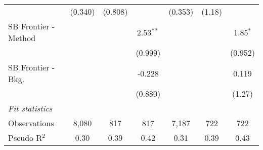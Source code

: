 \begin{tabular}{lcccccc}
                        & (0.340) & (0.808)       &               & (0.353) & (1.18)        &   \\   
   SB Frontier - Method &         &               & 2.53$^{**}$   &         &               & 1.85$^{*}$\\   
                        &         &               & (0.999)       &         &               & (0.952)\\   
   SB Frontier - Bkg.   &         &               & -0.228        &         &               & 0.119\\   
                        &         &               & (0.880)       &         &               & (1.27)\\   
   \midrule
   \emph{Fit statistics}\\
   Observations         & 8,080   & 817           & 817           & 7,187   & 722           & 722\\  
   Pseudo R$^2$         & 0.30    & 0.39          & 0.42          & 0.31    & 0.39          & 0.43\\  
   

\end{tabular}
